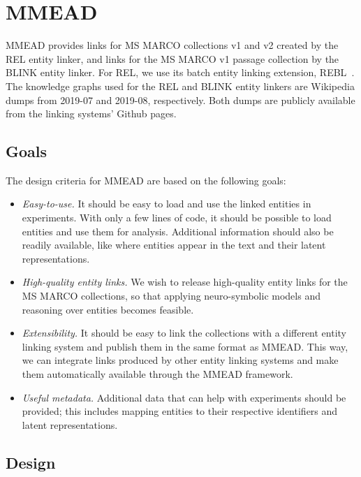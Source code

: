 \section{MMEAD}
MMEAD provides links for MS MARCO collections v1 and v2 created by the REL entity linker, and links for the MS MARCO v1 passage collection by the BLINK entity linker. For REL, we use its batch entity linking extension, REBL~\citep{rebl}. The knowledge graphs used for the REL and BLINK entity linkers are Wikipedia dumps from 2019-07 and 2019-08, respectively. Both dumps are publicly available from the linking systems' Github pages. 

\subsection{Goals}
The design criteria for MMEAD are based on the following goals:
\begin{itemize}
    \item \emph{Easy-to-use.} It should be easy to load and use the linked entities in experiments. With only a few lines of code, it should be possible to load entities and use them for analysis. Additional information should also be readily available, like where entities appear in the text and their latent representations.
	\item \emph{High-quality entity links.} We wish to release high-quality entity links for the MS MARCO collections, so that applying neuro-symbolic models and reasoning over entities becomes feasible.
	\item \emph{Extensibility.} It should be easy to link the collections with a different entity linking system and publish them in the same format as MMEAD. This way, we can integrate links produced by other entity linking systems and make them automatically available through the MMEAD framework.
	\item \emph{Useful metadata.} Additional data that can help with experiments should be provided; this includes mapping entities to their respective identifiers and latent representations.  
\end{itemize}

\subsection{Design}
